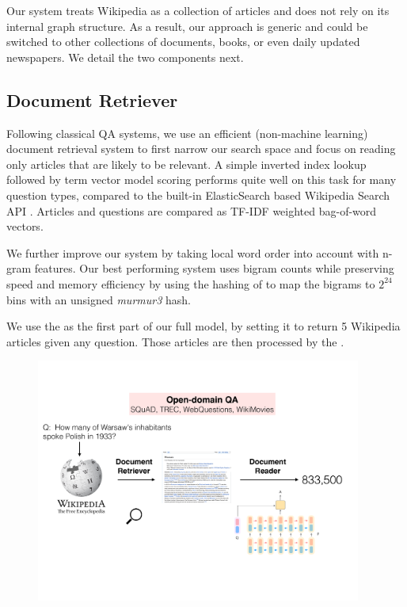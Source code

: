 Our system treats Wikipedia as a collection of articles and does not rely on its internal graph structure. As a result, our approach is generic and could be switched to other collections of documents, books, or even daily updated newspapers. We detail the two components next.

\subsection{Document Retriever}
\label{sec:doc-retriever}
Following classical QA systems, we use an efficient (non-machine learning) document retrieval system to first narrow our search space and focus on reading only articles that are likely to be relevant. A simple inverted index lookup followed by term vector model scoring performs quite well on this task for many question types, compared to the built-in ElasticSearch based Wikipedia Search API \cite{gormley2015elasticsearch}. Articles and questions are compared as TF-IDF weighted bag-of-word vectors.

We further improve our system by taking local word order into account with n-gram features. Our best performing system uses bigram counts while preserving speed and memory efficiency by using the hashing of \cite{weinberger2009feature} to map the bigrams to $2^{24}$ bins with an unsigned \emph{murmur3} hash.

We use the  as the first part of our full model, by setting it to return 5 Wikipedia
articles given any question. Those articles are then processed by the .


\begin{figure}[t]
\begin{center}
\includegraphics[height=8cm]{img/drqa_system.pdf}
\end{center}
\end{figure}

